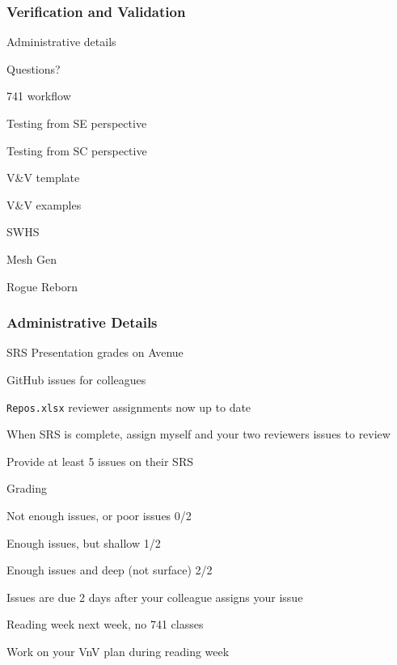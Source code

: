 \documentclass[t,12pt,numbers,fleqn]{beamer}
\begin{document}



\begin{frame}
\frametitle{Verification and Validation}

\bi
\item Administrative details
\item Questions?
\item 741 workflow
\item Testing from SE perspective
\item Testing from SC perspective
\item V\&V template
\item V\&V examples
\bi
\item SWHS
\item Mesh Gen
\item Rogue Reborn
\ei
\ei
\end{frame}


\begin{frame}
\frametitle{Administrative Details}

\bi
\item SRS Presentation grades on Avenue
\item GitHub issues for colleagues
\bi
\item \texttt{Repos.xlsx} reviewer assignments now up to date
\item When SRS is complete, assign myself and your two reviewers issues to
  review
\item Provide at least 5 issues on their SRS
\item Grading
\bi
\item Not enough issues, or poor issues 0/2
\item Enough issues, but shallow 1/2
\item Enough issues and deep (not surface) 2/2
\ei
\item Issues are due 2 days after your colleague assigns your issue
\ei
\item Reading week next week, no 741 classes
\item Work on your VnV plan during reading week
\ei

\end{frame}

\end{document}

